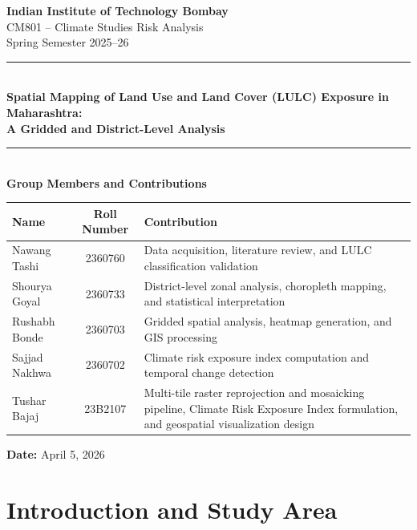\documentclass[12pt,a4paper]{article}
\begin{document}
\begin{titlepage}
\centering
\vspace*{1cm}
{\Large \textbf{Indian Institute of Technology Bombay}}\\[0.3cm]
{\large CM801 -- Climate Studies Risk Analysis}\\[0.2cm]
{\large Spring Semester 2025--26}\\[1.5cm]

\rule{\textwidth}{1.5pt}\\[0.5cm]
{\LARGE \textbf{Spatial Mapping of Land Use and Land Cover (LULC) Exposure in Maharashtra:}}\\[0.3cm]
{\LARGE \textbf{A Gridded and District-Level Analysis}}\\[0.5cm]
\rule{\textwidth}{1.5pt}\\[2cm]

{\large \textbf{Group Members and Contributions}}\\[0.5cm]

\begin{tabular}{|l|c|p{6cm}|}
\hline
\textbf{Name} & \textbf{Roll Number} & \textbf{Contribution} \\
\hline
Nawang Tashi   & 2360760 & Data acquisition, literature review, and LULC classification validation \\
\hline
Shourya Goyal  & 2360733 & District-level zonal analysis, choropleth mapping, and statistical interpretation \\
\hline
Rushabh Bonde  & 2360703 & Gridded spatial analysis, heatmap generation, and GIS processing \\
\hline
Sajjad Nakhwa  & 2360702 & Climate risk exposure index computation and temporal change detection \\
\hline
Tushar Bajaj   & 23B2107 & Multi-tile raster reprojection and mosaicking pipeline, Climate Risk Exposure Index formulation, and geospatial visualization design \\
\hline
\end{tabular}

\vfill
{\large \textbf{Date:} April 5, 2026}
\end{titlepage}

\section{Introduction and Study Area}
\end{document}
